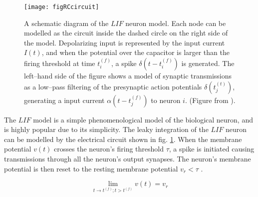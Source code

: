 	
\begin{figure}[tb!hp]
	\centering
	\texttt{[image: figRCcircuit]}
	\caption[A schematic diagram of the $LIF$ neuron model]
			{A schematic diagram of the $LIF$ neuron model. 
			Each node can be modelled as the circuit inside the dashed circle on the right side of the model.
			Depolarizing input is represented by the input current $I(t)$, and when the potential over the capacitor is larger than the firing threshold at time $t_i^{(f)}$, a spike $\delta(t-t_i^{(f)})$ is generated. 
			The left--hand side of the figure shows a model of synaptic transmissions as a low--pass filtering of the presynaptic action potentials $\delta(t_j^{(t)})$, generating a input current $\alpha(t-t_j^{(f)})$ to neuron $i$.
			(Figure from \cite{gerstnerKistler2002KAP04}).
			}
	\label{figRCcircuitAvNeuronet}
\end{figure}
	The $LIF$ model is a simple phenomenological model of the biological neuron, and is highly popular due to its simplicity.
	The leaky integration of the $LIF$ neuron can be modelled by the electrical circuit shown in fig. \ref{figRCcircuitAvNeuronet}.
	When the membrane potential $v(t)$ crosses the neuron's firing threshold $\tau$, a spike is initiated causing transmissions through all the neuron's output synapses.
	The neuron's membrane potential is then reset to the resting membrane potential $v_r<\tau$ \cite{gerstnerKistler2002KAP04}.

\begin{equation}
	\lim\limits_{t\to t^{(f)}; t>t^{(f)}} v(t) = v_r
\end{equation}

